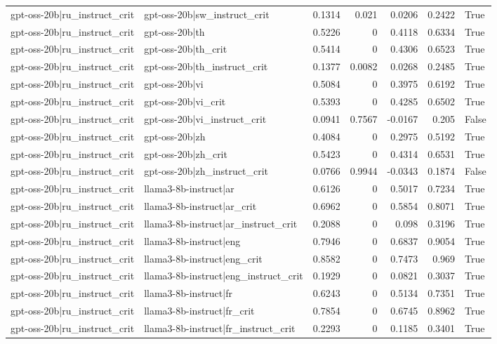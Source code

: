 \begin{table}
\begin{tabular}{l l r r r r l}
gpt-oss-20b|ru_instruct_crit & gpt-oss-20b|sw_instruct_crit & 0.1314 & 0.021 & 0.0206 & 0.2422 & True \\
gpt-oss-20b|ru_instruct_crit & gpt-oss-20b|th & 0.5226 & 0 & 0.4118 & 0.6334 & True \\
gpt-oss-20b|ru_instruct_crit & gpt-oss-20b|th_crit & 0.5414 & 0 & 0.4306 & 0.6523 & True \\
gpt-oss-20b|ru_instruct_crit & gpt-oss-20b|th_instruct_crit & 0.1377 & 0.0082 & 0.0268 & 0.2485 & True \\
gpt-oss-20b|ru_instruct_crit & gpt-oss-20b|vi & 0.5084 & 0 & 0.3975 & 0.6192 & True \\
gpt-oss-20b|ru_instruct_crit & gpt-oss-20b|vi_crit & 0.5393 & 0 & 0.4285 & 0.6502 & True \\
gpt-oss-20b|ru_instruct_crit & gpt-oss-20b|vi_instruct_crit & 0.0941 & 0.7567 & -0.0167 & 0.205 & False \\
gpt-oss-20b|ru_instruct_crit & gpt-oss-20b|zh & 0.4084 & 0 & 0.2975 & 0.5192 & True \\
gpt-oss-20b|ru_instruct_crit & gpt-oss-20b|zh_crit & 0.5423 & 0 & 0.4314 & 0.6531 & True \\
gpt-oss-20b|ru_instruct_crit & gpt-oss-20b|zh_instruct_crit & 0.0766 & 0.9944 & -0.0343 & 0.1874 & False \\
gpt-oss-20b|ru_instruct_crit & llama3-8b-instruct|ar & 0.6126 & 0 & 0.5017 & 0.7234 & True \\
gpt-oss-20b|ru_instruct_crit & llama3-8b-instruct|ar_crit & 0.6962 & 0 & 0.5854 & 0.8071 & True \\
gpt-oss-20b|ru_instruct_crit & llama3-8b-instruct|ar_instruct_crit & 0.2088 & 0 & 0.098 & 0.3196 & True \\
gpt-oss-20b|ru_instruct_crit & llama3-8b-instruct|eng & 0.7946 & 0 & 0.6837 & 0.9054 & True \\
gpt-oss-20b|ru_instruct_crit & llama3-8b-instruct|eng_crit & 0.8582 & 0 & 0.7473 & 0.969 & True \\
gpt-oss-20b|ru_instruct_crit & llama3-8b-instruct|eng_instruct_crit & 0.1929 & 0 & 0.0821 & 0.3037 & True \\
gpt-oss-20b|ru_instruct_crit & llama3-8b-instruct|fr & 0.6243 & 0 & 0.5134 & 0.7351 & True \\
gpt-oss-20b|ru_instruct_crit & llama3-8b-instruct|fr_crit & 0.7854 & 0 & 0.6745 & 0.8962 & True \\
gpt-oss-20b|ru_instruct_crit & llama3-8b-instruct|fr_instruct_crit & 0.2293 & 0 & 0.1185 & 0.3401 & True \\

\end{tabular}
\end{table}

